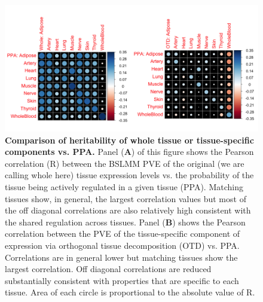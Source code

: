 \documentclass[10pt,letterpaper]{article}
\begin{document}
\begin{figure}[H]
\includegraphics[width=12cm]{Figures/Fig-cor-StephensPr-v-PVE.png}
\caption{{\bf Comparison of heritability of whole tissue or tissue-specific components vs. PPA.} 
Panel (\textbf{A}) of this figure shows the Pearson correlation (R) between the BSLMM PVE of the original (we are calling whole here) tissue expression levels vs. the probability of the tissue being actively regulated in a given tissue (PPA). Matching tissues show, in general, the largest correlation values but most of the off diagonal correlations are also relatively high consistent with the shared regulation across tissues. 
Panel (\textbf{B}) shows the Pearson correlation between the PVE of the tissue-specific component of expression via orthogonal tissue decomposition (OTD) vs. PPA. Correlations are in general lower but matching tissues show the largest correlation. Off diagonal correlations are reduced substantially consistent with properties that are specific to each tissue. 
Area of each circle is proportional to the absolute value of R.
}
\label{fig-corrplot}
\end{figure}


\end{document}
